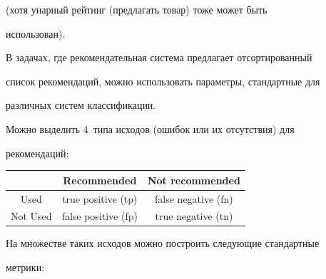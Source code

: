 (хотя унарный рейтинг (предлагать товар) тоже может быть


использован).





В задачах, где рекомендательная система предлагает отсортированный


список рекомендаций, можно использовать параметры, стандартные для


различных систем классификации.





Можно выделить 4~типа исходов (ошибок или их отсутствия) для


рекомендаций: 





\smallskip





\begin{center}


\begin{tabular}{|c|c|c|}


  \hline


 & Recommended & Not recommended \\


\hline


Used & true positive (tp) & false negative (fn) \\


Not Used & false positive (fp) & true negative (tn) \\


\hline


\end{tabular}


\end{center}








На множестве таких исходов можно построить следующие стандартные


мет\-рики:


